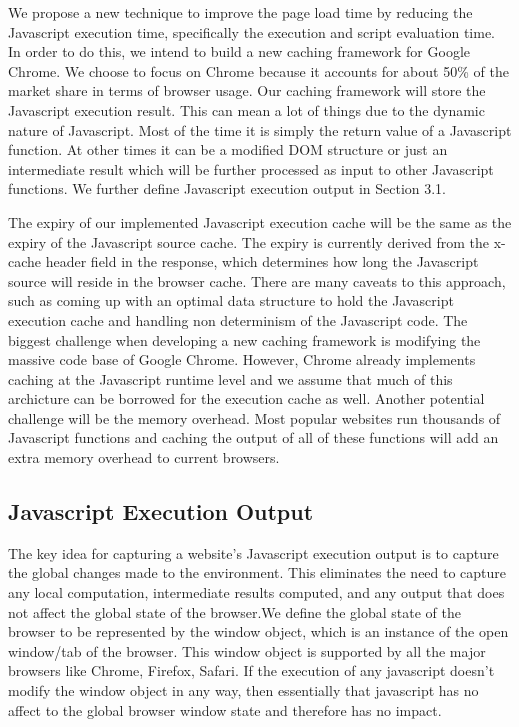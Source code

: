 We propose a new technique to improve the page load time by reducing the Javascript execution time,
specifically the execution and script evaluation time.  
In order to do this, we intend to build a new caching framework for Google Chrome. We choose to focus on Chrome because it accounts for about 50\% of the market share in terms of browser
usage. Our caching framework will store the Javascript execution result. This can mean a lot of things
due to the dynamic nature of Javascript. Most of the time it is simply the return value of a 
Javascript function. At other times it can be a modified DOM structure or just an intermediate result which
will be further processed as input to other Javascript functions. 
We further define Javascript execution output in Section 3.1.

The expiry of our implemented Javascript execution cache will be the same as the expiry of the Javascript source cache.
The expiry is currently derived from the x-cache header field in the response, which determines how long
the Javascript source will reside in the browser cache. 
There are many caveats to this approach, such as coming up with an optimal data structure to hold the 
Javascript execution cache and handling non determinism of the Javascript code.
The biggest challenge when developing a new caching framework is modifying the massive code base of Google Chrome. However, Chrome already implements caching at the Javascript runtime level and we assume that much of this archicture can be borrowed
for the execution cache as well. 
Another potential challenge will be the memory overhead. Most popular websites run thousands of Javascript functions and caching the output of all 
of these functions will add an extra memory overhead to current browsers. 

\subsection{Javascript Execution Output}
\label{sec:exec-output}

The key idea for capturing a website's Javascript execution output 
is to capture the global changes made to the environment. This eliminates the need to capture any local computation, intermediate results computed, and any output
that does not affect the global state of the browser.We define the global state of the browser to be represented by the window object, which is
an instance of the open window/tab of the browser. This window object is supported by all the 
major browsers like Chrome, Firefox, Safari. 
If the execution of any javascript doesn't modify the window object in any way, then essentially
that javascript has no affect to the global browser window state and therefore has no impact.

